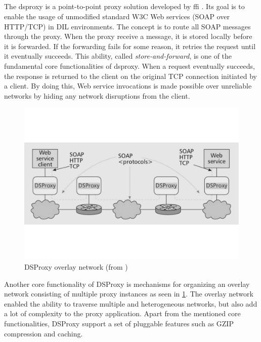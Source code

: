 \subsection{}

The \gls{dsproxy} is a point-to-point proxy solution developed by \gls{ffi}
\cite{dsproxy-ffi}\cite{ieee-dsproxy}. Its goal is to enable the usage of
unmodified standard W3C Web services (SOAP over HTTP/TCP) in DIL environments.
The concept is to route all SOAP messages through the proxy. When the proxy
receive a message, it is stored locally before it is forwarded. If the
forwarding fails for some reason, it retries the request until it eventually
succeeds. This ability, called \textit{store-and-forward}, is one of the
fundamental core functionalities of \gls{dsproxy}. When a request eventually
succeeds, the response is returned to the client on the original TCP connection
initiated by a client. By doing this, Web service invocations is made possible
over unreliable networks by hiding any network disruptions from the client.

\begin{figure}[h]
\includegraphics[scale=0.35]{images/dsproxy_gray.pdf}
\caption{DSProxy overlay network (from \cite{ieee-dsproxy} )}
\label{figure:dsproxy}
\end{figure}

Another core functionality of DSProxy is mechanisms for organizing an overlay
network consisting of multiple proxy instances as seen in \cref{figure:dsproxy}.
The overlay network enabled the ability to traverse multiple and heterogeneous
networks, but also add a lot of complexity to the proxy application. Apart from
the mentioned core functionalities, DSProxy support a set of pluggable
features such as GZIP compression and caching.

